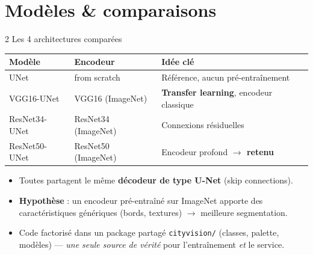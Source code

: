\documentclass[aspectratio=169,11pt]{beamer}
\newcommand{\emphc}[1]{\textbf{\color{cvblue}#1}}
\newcommand{\code}[1]{\texttt{\small #1}}
\begin{document}
\section{Modèles \& comparaisons}
\begin{frame}{2 \textbar{} Les 4 architectures comparées}
  \centering
  \renewcommand{\arraystretch}{1.3}
  \begin{tabular}{@{}lll@{}}
    \toprule
    \textbf{Modèle} & \textbf{Encodeur} & \textbf{Idée clé} \\
    \midrule
    UNet          & from scratch          & Référence, aucun pré-entraînement \\
    VGG16-UNet    & VGG16 (ImageNet)      & \emphc{Transfer learning}, encodeur classique \\
    ResNet34-UNet & ResNet34 (ImageNet)   & Connexions résiduelles \\
    \rowcolor{cvgreen!18}
    ResNet50-UNet & ResNet50 (ImageNet)   & Encodeur profond \textbf{$\rightarrow$ retenu} \\
    \bottomrule
  \end{tabular}
  \vspace{0.8em}
  \begin{itemize}\footnotesize
    \item Toutes partagent le même \emphc{décodeur de type U-Net} (skip connections).
    \item \emphc{Hypothèse} : un encodeur pré-entraîné sur ImageNet apporte des
      caractéristiques génériques (bords, textures) $\rightarrow$ meilleure segmentation.
    \item Code factorisé dans un package partagé \code{cityvision/} (classes, palette, modèles)
      — \emph{une seule source de vérité} pour l'entraînement \emph{et} le service.
  \end{itemize}
\end{frame}
\end{document}
